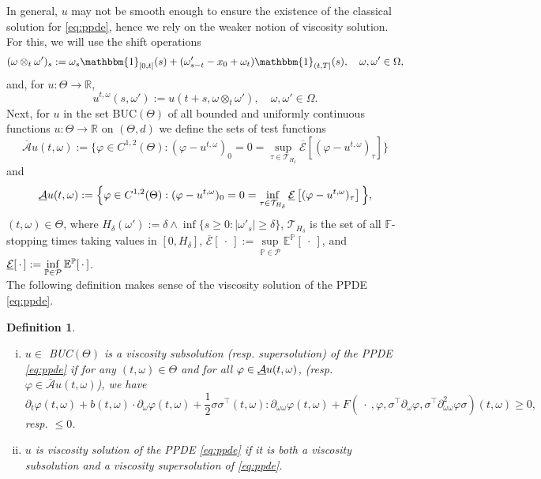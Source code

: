 \documentclass[12pt]{article}
\newtheorem{definition}[prop]{Definition}
\numberwithin{equation}{section}
\newcommand{\abs}[1]{\lvert#1\rvert}
\def\P{{\mathord{\mathbb P}}}
\newcommand{\ubar}[1]{\smash{\underline {#1}}}
\newcommand{\E}{\mathbb{E}}
\newcommand{\real}{\mathbb{R}}
\begin{document}
\noindent
In general, $u$ may not be smooth enough to ensure
the existence of the classical solution for \eqref{eq:ppde},
hence we rely on the weaker notion of viscosity solution.
For this, we will use the shift operations
$$
	(\omega \otimes_t \omega')_s := \omega_s \mathbbm{1}_{[0,t]}(s) +
			(\omega'_{s-t} - x_0 + \omega_t) \mathbbm{1}_{(t,T]}(s),
  \quad
  \omega, \omega' \in \Omega,
$$
        and, for $u:\Theta \to \real$,
$$
        u^{t,\omega}(s, \omega'):= u(t+s, \omega \otimes_t \omega'),
        \quad
        \omega, \omega' \in \Omega.
$$
 Next, for $u$ in the set BUC$(\Theta)$
of all bounded and uniformly continuous functions $u:\Theta \rightarrow \real$
 on $(\Theta , d)$
 we define the sets of test functions
$$
\overline{\mathcal{A}}u(t, \omega) := \Big\{
		\varphi \in C^{1,2}(\Theta) :
		(\varphi - u^{t,\omega})_0 = 0 =\sup\limits_{\tau \in \mathcal{T}_{H_\delta}}
		\overline{\mathcal{E}} \left[ (\varphi - u^{t, \omega})_\tau \right]
	        \Big\}
                $$
                and
                $$
	\ubar{\mathcal{A}}u(t, \omega) := \Big\{
		\varphi \in C^{1,2}(\Theta) :
		(\varphi - u^{t,\omega})_0 = 0 = \inf\limits_{\tau \in \mathcal{T}_{H_\delta}}
		\ubar{\mathcal{E}} \left[ (\varphi - u^{t, \omega})_\tau \right]
	\Big\},
$$
        $(t,\omega) \in \Theta$, where
$H_\delta(\omega') := \delta \land \inf\{ s \ge 0: \abs{\omega'_s} \ge \delta \}$,
$\mathcal{T}_{H_\delta}$ is the set of all
$\mathbb{F}$-stopping times taking values in $[0,H_\delta]$,
$\overline{\mathcal{E}} [ \ \! \cdot \ \! ] := \sup\limits_{\P \in \mathcal{P} } \E^\P[ \ \! \cdot \ \! ]$,
and $\ubar{\mathcal{E}} [ \ \! \cdot \ \! ] := \inf\limits_{\P \in \mathcal{P} } \E^\P[ \ \! \cdot \ \! ]$.
\\
The following definition makes sense of
the viscosity solution of the PPDE \eqref{eq:ppde}.
\begin{definition}
	 \begin{enumerate}[i)]
		 \item $u \in $ BUC$(\Theta)$ is a viscosity subsolution
			 (resp. supersolution) of the PPDE \eqref{eq:ppde}
			 if for any $(t,\omega) \in \Theta$ and
			 for all
			 $\varphi \in \ubar{\mathcal{A}} u(t, \omega)$,
			 (resp. $\varphi \in \bar{\mathcal{A}} u(t, \omega)$),
			 we have
                         $$
                         \! \! \! \! \!
                        \partial_t \varphi (t, \omega)
			+ b(t, \omega)
			\cdot \partial_\omega \varphi(t, \omega)
			+ \frac{1}{2}\sigma\sigma^\top(t, \omega)
			:\partial_{\omega\omega} \varphi(t, \omega)
						+ F\left(\ \! \cdot \ \! , \varphi,
				\sigma^\top \partial_\omega \varphi,
				\sigma^\top
				\partial^2_{\omega\omega}\varphi
				\sigma\right)(t, \omega)
			\ge 0,
$$
                      resp. $\leq 0$.
	              \item $u$ is viscosity solution of
		 the PPDE \eqref{eq:ppde} if
		 it is both a viscosity subsolution and
		 a viscosity supersolution of \eqref{eq:ppde}.
	\end{enumerate}
\end{definition}
\end{document}
